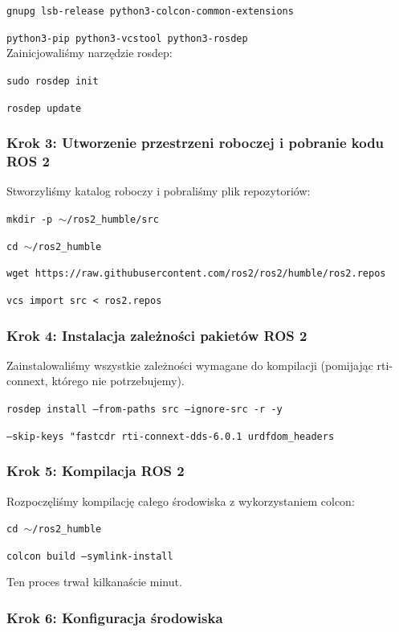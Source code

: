 \documentclass[12pt]{article}
\begin{document}
\texttt{gnupg lsb-release python3-colcon-common-extensions}


\texttt{python3-pip python3-vcstool python3-rosdep}
\\

\noindent Zainicjowaliśmy narzędzie rosdep:

\texttt{sudo rosdep init}


\texttt{rosdep update}


\subsubsection{Krok 3: Utworzenie przestrzeni roboczej i pobranie kodu ROS 2}

Stworzyliśmy katalog roboczy i pobraliśmy plik repozytoriów:


\texttt{mkdir -p $\sim$/ros2\_humble/src}

\texttt{cd $\sim$/ros2\_humble}

\texttt{wget https://raw.githubusercontent.com/ros2/ros2/humble/ros2.repos}

\texttt{vcs import src < ros2.repos}

\subsubsection{Krok 4: Instalacja zależności pakietów ROS 2}

Zainstalowaliśmy wszystkie zależności wymagane do kompilacji (pomijając rti-connext, którego nie potrzebujemy).


\texttt{rosdep install --from-paths src --ignore-src -r -y}

\texttt{--skip-keys "fastcdr rti-connext-dds-6.0.1 urdfdom\_headers}


\subsubsection{Krok 5: Kompilacja ROS 2}

Rozpoczęliśmy kompilację całego środowiska z wykorzystaniem colcon:

\texttt{cd $\sim$/ros2\_humble}

\texttt{colcon build --symlink-install}

\noindent Ten proces trwał kilkanaście minut.


\subsubsection{Krok 6: Konfiguracja środowiska}
\end{document}
